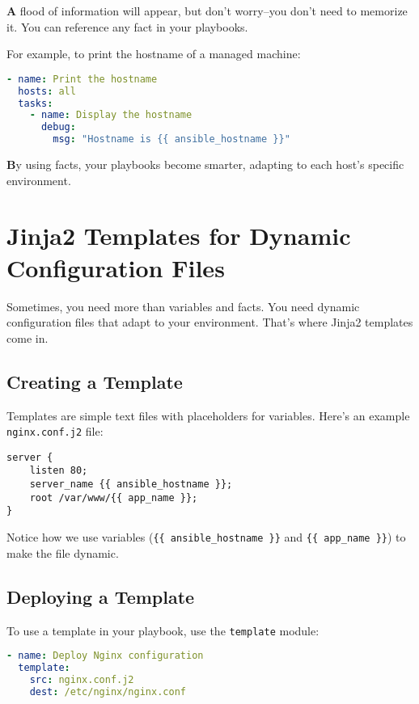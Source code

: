 \textbf{A} flood of information will appear, but don't worry--you don't need to memorize it. You can reference any fact in your playbooks.

For example, to print the hostname of a managed machine:
\begin{lstlisting}[language=yaml, caption=Using a Fact in a Playbook]
- name: Print the hostname
  hosts: all
  tasks:
    - name: Display the hostname
      debug:
        msg: "Hostname is {{ ansible_hostname }}"
\end{lstlisting}

\textbf{B}y using facts, your playbooks become smarter, adapting to each host's specific environment.


\section{Jinja2 Templates for Dynamic Configuration Files}

Sometimes, you need more than variables and facts. You need dynamic configuration files that adapt to your environment. That's where Jinja2 templates come in.

\subsection{Creating a Template}

Templates are simple text files with placeholders for variables. Here's an example \texttt{nginx.conf.j2} file:
\begin{lstlisting}[language=nginx, caption=Jinja2 Template for Nginx]
server {
    listen 80;
    server_name {{ ansible_hostname }};
    root /var/www/{{ app_name }};
}
\end{lstlisting}

Notice how we use variables (\texttt{\{\{ ansible\_hostname \}\}} and \texttt{\{\{ app\_name \}\}}) to make the file dynamic.

\subsection{Deploying a Template}

To use a template in your playbook, use the \texttt{template} module:
\begin{lstlisting}[language=yaml, caption=Deploying a Template]
- name: Deploy Nginx configuration
  template:
    src: nginx.conf.j2
    dest: /etc/nginx/nginx.conf
\end{lstlisting}

